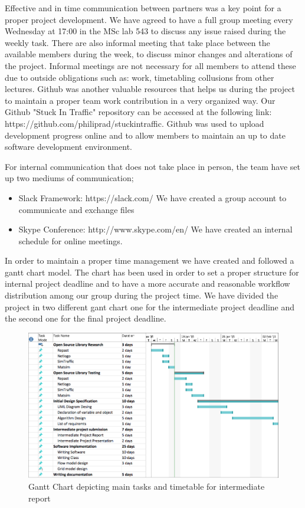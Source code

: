 \documentclass[oneside]{article}
\begin{document}
Effective and in time communication between partners was a key point for a proper project development. 
We have agreed to have a full group meeting every Wednesday at 17:00 in the MSc lab 543 to discuss any issue raised during the weekly task. There are also informal meeting that take place between the available members during the week, to discuss minor changes and alterations of the project. Informal meetings are not necessary for all members to attend these due to outside obligations such as: work, timetabling collusions from other lectures. Github was another valuable resources that helps us during the project to maintain a proper team work contribution in a very organized way. Our Github "Stuck In Traffic" repository can be accessed at the following link: https://github.com/philiprad/stuckintraffic. Github was used to upload development progress online and to allow members to maintain an up to date software development environment.


\noindent For internal communication that does not take place in person, the team have set up two mediums of communication; 

 \begin{itemize} 
  \item Slack Framework: https://slack.com/ We have created a group account to communicate and exchange files  
  \item Skype Conference: http://www.skype.com/en/ We have created an internal schedule for online meetings. 
 \end{itemize}
\newpage

\noindent In order to maintain a proper time management we have created and followed a gantt chart model. The chart has been used in order to set a proper structure for internal project deadline and to have a more accurate and reasonable workflow distribution among our group during the project time. We have divided the project in two different gant chart one for the intermediate project deadline and the second one for the final project deadline. 

\begin{figure}[h]
\centering
\includegraphics[width=6.5in]{ganttchart_old}
\caption{Gantt Chart depicting main tasks and timetable for intermediate report}
\end{figure}
\end{document}
